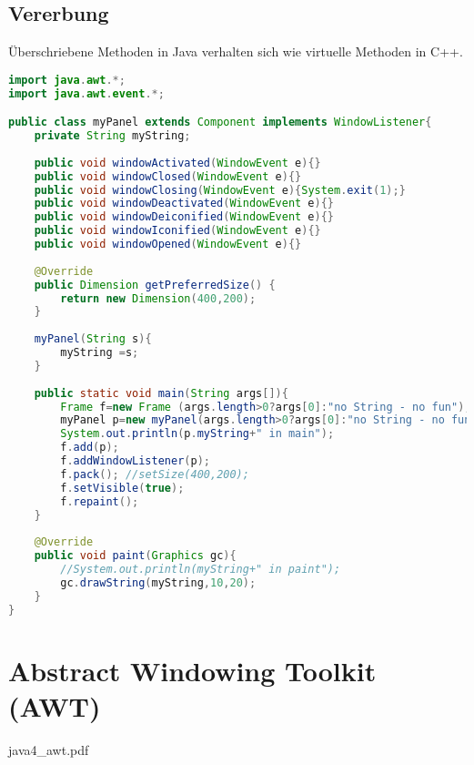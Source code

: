 \subsection{Vererbung}
Überschriebene Methoden in Java verhalten sich wie virtuelle Methoden in C++.

\begin{lstlisting}[language=Java]
import java.awt.*;
import java.awt.event.*;

public class myPanel extends Component implements WindowListener{
	private String myString;
	
	public void windowActivated(WindowEvent e){}
	public void windowClosed(WindowEvent e){}
	public void windowClosing(WindowEvent e){System.exit(1);}
	public void windowDeactivated(WindowEvent e){}
	public void windowDeiconified(WindowEvent e){}
	public void windowIconified(WindowEvent e){}
	public void windowOpened(WindowEvent e){}
	
	@Override
	public Dimension getPreferredSize()	{
		return new Dimension(400,200);
	}
	
	myPanel(String s){
		myString =s;
	}
	
	public static void main(String args[]){
		Frame f=new Frame (args.length>0?args[0]:"no String - no fun");
		myPanel p=new myPanel(args.length>0?args[0]:"no String - no fun");
		System.out.println(p.myString+" in main");
		f.add(p);
		f.addWindowListener(p);
		f.pack(); //setSize(400,200);
		f.setVisible(true);
		f.repaint();
	}
	
	@Override
	public void paint(Graphics gc){
		//System.out.println(myString+" in paint");
		gc.drawString(myString,10,20);
	}
}
\end{lstlisting}

\section{Abstract Windowing Toolkit (AWT)}
java4\_awt.pdf


\newpage
\printbibliography
